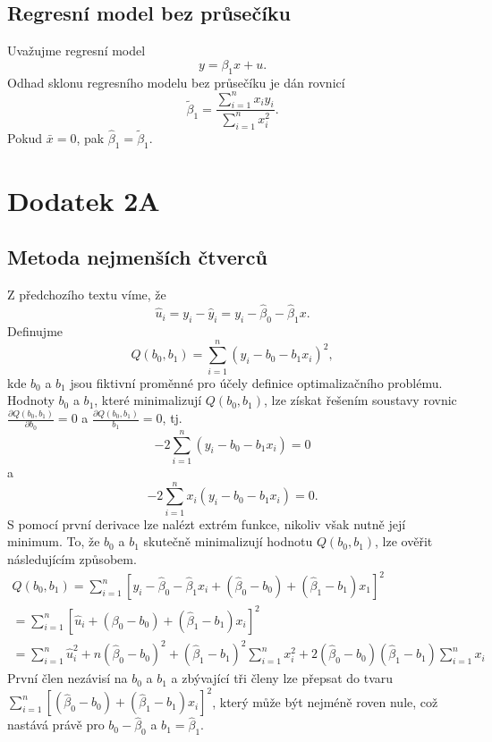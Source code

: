 \subsection{Regresní model bez průsečíku}

Uvažujme regresní model
\begin{equation}
y = \beta_1 x + u.
\end{equation}
Odhad sklonu regresního modelu bez průsečíku je dán rovnicí
\begin{equation}
\tilde{\beta}_1 = \frac{\sum_{i = 1}^n x_i y_i}{\sum_{i = 1}^n x_i^2}.
\end{equation}
Pokud $\bar{x} = 0$, pak $\hat{\beta}_1 = \tilde{\beta}_1$.

\section{Dodatek 2A}

\subsection{Metoda nejmenších čtverců}

Z předchozího textu víme, že
\begin{equation}
\hat{u}_i = y_i - \hat{y}_i = y_i - \hat{\beta}_0 - \hat{\beta}_1 x.
\end{equation}
Definujme
\begin{equation}
Q(b_0, b_1) = \sum_{i = 1}^n (y_i - b_0 - b_1 x_i)^2,
\end{equation}
kde $b_0$ a $b_1$ jsou fiktivní proměnné pro účely definice optimalizačního problému. Hodnoty $b_0$ a $b_1$, které minimalizují $Q(b_0, b_1)$, lze získat 
řešením soustavy rovnic $\frac{\partial Q(b_0, b_1)}{\partial b_0} = 0$ a $\frac{\partial Q(b_0, b_1)}{b_1} = 0$, tj.
\begin{equation}
-2 \sum_{i = 1}^n (y_i - b_0 - b_1 x_i) = 0
\end{equation}
a
\begin{equation}
-2 \sum_{i = 1}^n x_i(y_i - b_0 - b_1 x_i) = 0.
\end{equation}
S pomocí první derivace lze nalézt extrém funkce, nikoliv však nutně její minimum. To, že $b_0$ a $b_1$ 
skutečně minimalizují hodnotu $Q(b_0, b_1)$, lze ověřit následujícím způsobem.
\begin{multline}
Q(b_0, b_1) = \sum_{i = 1}^n \left[y_i - \hat{\beta}_0 - \hat{\beta}_1 x_i + (\hat{\beta}_0 - b_0) + (\hat{\beta}_1 - 
b_1) x_1 \right]^2\\
= \sum_{i = 1}^n \left[\hat{u}_i + (\beta_0 - b_0) + (\hat{\beta}_1 - b_1)x_i \right]^2\\
= \sum_{i = 1}^n \hat{u}_i^2 + n(\hat{\beta}_0 - b_0)^2 + (\hat{\beta}_1 - b_1)^2 \sum_{i = 1}^n x_i^2 + 
2(\hat{\beta}_0 - b_0)(\hat{\beta}_1 - b_1)\sum_{i = 1}^n x_i
\end{multline}
První člen nezávisí na $b_0$ a $b_1$ a zbývající tři členy lze přepsat do tvaru $\sum_{i = 1}^n 
\left[(\hat{\beta}_0 - b_0) + (\hat{\beta}_1 - b_1)x_i \right]^2$, který může být nejméně roven nule, což 
nastává právě pro $b_0 - \hat{\beta}_0$ a $b_1 = \hat{\beta}_1$.
